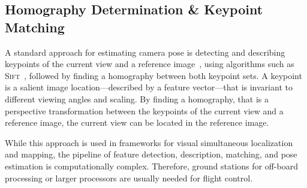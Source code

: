 \subsection{Homography Determination \& Keypoint Matching}
\label{sec:keypointmatching}

A standard approach for estimating camera pose is detecting and
describing keypoints of the current view and a reference image~\cite{se2002global}, using
algorithms such as \textsc{Sift}~\cite{lowe1999object}, followed by finding a homography between both keypoint sets. A
keypoint is a salient image location---described by a feature vector---that is invariant to different
viewing angles and scaling. By finding a homography, that is a perspective transformation between the keypoints of the current view and a reference image, the current view can be located in the reference image.


While this approach is used in frameworks for visual simultaneous localization and mapping, the pipeline of feature detection, description, matching, and pose estimation is computationally complex. Therefore, ground stations for off-board processing or larger processors are usually needed for flight control.  

